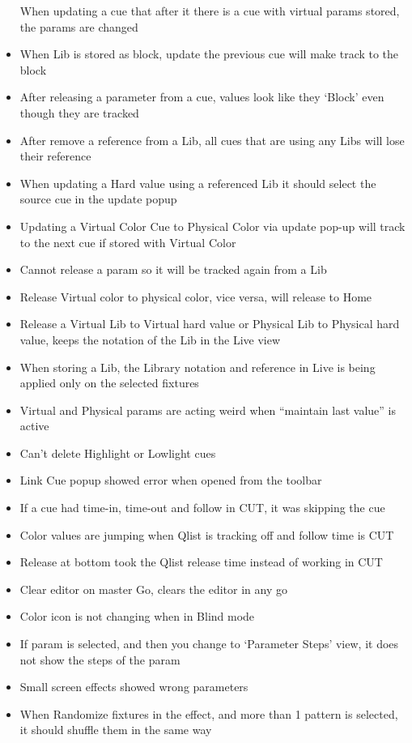 \documentclass[
]{article}
\begin{document}
\begin{itemize}
  When updating a cue that after it there is a cue with virtual params stored, the params are changed
\item
  When Lib is stored as block, update the previous cue will make track to the block
\item
  After releasing a parameter from a cue, values look like they `Block' even though they are tracked
\item
  After remove a reference from a Lib, all cues that are using any Libs will lose their reference
\item
  When updating a Hard value using a referenced Lib it should select the source cue in the update popup
\item
  Updating a Virtual Color Cue to Physical Color via update pop-up will track to the next cue if stored with Virtual Color
\item
  Cannot release a param so it will be tracked again from a Lib
\item
  Release Virtual color to physical color, vice versa, will release to Home
\item
  Release a Virtual Lib to Virtual hard value or Physical Lib to Physical hard value, keeps the notation of the Lib in the Live view
\item
  When storing a Lib, the Library notation and reference in Live is being applied only on the selected fixtures
\item
  Virtual and Physical params are acting weird when ``maintain last value'' is active
\item
  Can't delete Highlight or Lowlight cues
\item
  Link Cue popup showed error when opened from the toolbar
\item
  If a cue had time-in, time-out and follow in CUT, it was skipping the cue
\item
  Color values are jumping when Qlist is tracking off and follow time is CUT
\item
  Release at bottom took the Qlist release time instead of working in CUT
\item
  Clear editor on master Go, clears the editor in any go
\item
  Color icon is not changing when in Blind mode
\item
  If param is selected, and then you change to `Parameter Steps' view, it does not show the steps of the param
\item
  Small screen effects showed wrong parameters
\item
  When Randomize fixtures in the effect, and more than 1 pattern is selected, it should shuffle them in the same way

\end{itemize}
\end{document}
